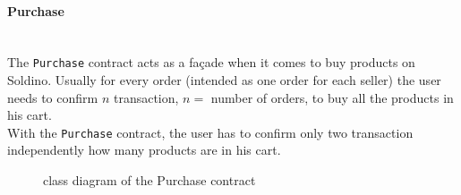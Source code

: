 \paragraph{Purchase}\mbox{}\\ 

\noindent The \texttt{Purchase} contract acts as a façade when it comes to buy products on Soldino.
Usually for every order (intended as one order for each seller) the user needs to confirm $n$ transaction, $n =$ number of orders, to buy all the products in his cart.\\
With the \texttt{Purchase} contract, the user has to confirm only two transaction independently how many products are in his cart. 
\begin{figure}[H]
	\centering
	\caption{class diagram of the Purchase contract}
\end{figure}